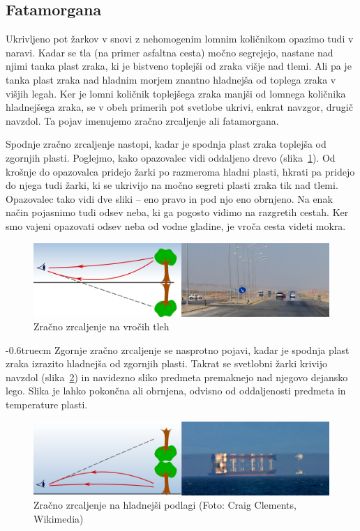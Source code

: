 \subsection*{Fatamorgana}
Ukrivljeno pot žarkov v snovi z nehomogenim lomnim količnikom opazimo
tudi v naravi. Kadar se tla (na primer asfaltna cesta) 
močno segrejejo, nastane nad njimi tanka plast zraka, ki je bistveno 
toplejši od zraka višje nad tlemi. Ali pa je tanka plast zraka nad 
hladnim morjem znantno hladnejša od toplega zraka v višjih legah. Ker je 
lomni količnik toplejšega zraka manjši od lomnega količnika hladnejšega zraka, 
se v obeh primerih pot svetlobe ukrivi, enkrat navzgor, drugič navzdol. Ta pojav
imenujemo zračno zrcaljenje ali fatamorgana. 

Spodnje zračno zrcaljenje nastopi, kadar je spodnja plast zraka toplejša 
od zgornjih plasti. Poglejmo, kako opazovalec vidi oddaljeno drevo 
(slika~\ref{fig:02_Fata1}). Od krošnje do opazovalca pridejo žarki
po razmeroma hladni plasti, hkrati pa pridejo do njega tudi žarki, ki 
se ukrivijo na močno segreti plasti zraka tik nad tlemi. Opazovalec
tako vidi dve sliki -- eno pravo in pod njo eno obrnjeno. Na enak način 
pojasnimo tudi odsev neba, ki ga pogosto vidimo na razgretih cestah.
Ker smo vajeni opazovati
odsev neba od vodne gladine, je vroča cesta videti mokra.
\begin{figure}[h!]
\centering
\includegraphics[width=12truecm]{slike/02_Fata1.jpg}
\caption{Zračno zrcaljenje na vročih tleh}
\label{fig:02_Fata1}
\end{figure}
\vglue-0.6truecm
Zgornje zračno zrcaljenje se nasprotno pojavi, 
kadar je spodnja plast zraka izrazito hladnejša od zgornjih plasti. 
Takrat se svetlobni žarki krivijo navzdol (slika~\ref{fig:02_Fata2})
in navidezno sliko predmeta premaknejo nad njegovo dejansko lego. 
Slika je lahko pokončna ali obrnjena, odvisno od oddaljenosti predmeta
in temperature plasti. 
\begin{figure}[h!]
\centering
\includegraphics[width=12truecm]{slike/02_Fata2.jpg}
\caption{Zračno zrcaljenje na hladnejši podlagi (Foto: Craig Clements, Wikimedia)}
\label{fig:02_Fata2}
\end{figure}

